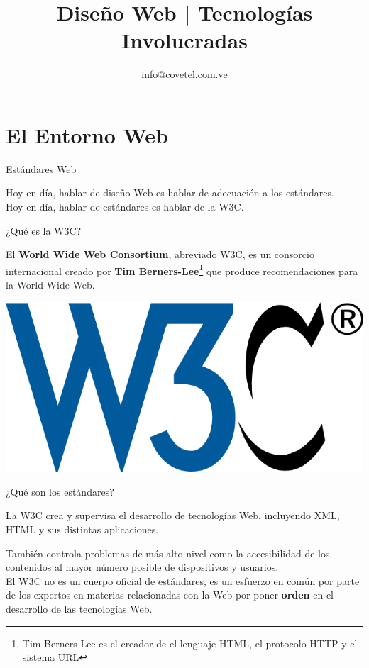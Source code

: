 \documentclass{beamer}
\title[WebDesign] {Diseño Web | Tecnologías Involucradas}
\author[Walter Vargas]{ info@covetel.com.ve \inst{1}}
\institute[covetel.com.ve]{ \inst{1} Cooperativa Venezolana de Tecnologías Libres R.S. }
\date
\begin{document}
\begin{frame}
  \titlepage
\end{frame}

\section{El Entorno Web}
\begin{frame}{Estándares Web} %

\begin{center}
Hoy en día, hablar de diseño Web es hablar de adecuación a los estándares.
\pause \\[0.5cm]
Hoy en día, hablar de estándares es hablar de la W3C.
\end{center}
\end{frame}


\begin{frame}{¿Qué es la W3C?} %
\begin{center}
El {\bfseries World Wide Web Consortium}, abreviado W3C, es un consorcio
internacional creado por {\bfseries Tim Berners-Lee}\footnote{Tim Berners-Lee
es el creador de el lenguaje HTML, el protocolo HTTP y  el sistema URL} que produce recomendaciones para la World Wide Web.
\\[0.5cm]
\pause

\includegraphics{imgs/w3c.png}
\end{center}

\end{frame}

\begin{frame}{¿Qué son los estándares?} %

    \begin{center}
    La W3C crea y supervisa el desarrollo de tecnologías Web, incluyendo XML,
    HTML y sus distintas aplicaciones. \\[0.5cm]
    \pause

    También controla problemas de más alto nivel como la accesibilidad de los
    contenidos al mayor número posible de dispositivos y usuarios.\\[0.5cm]
    \pause
    El W3C no es un cuerpo oficial de estándares, es un esfuerzo en común por
    parte de los expertos en materias relacionadas con la Web por poner
    {\bfseries orden} en el desarrollo de las tecnologías Web.
    \end{center}
\end{frame}
\end{document}
